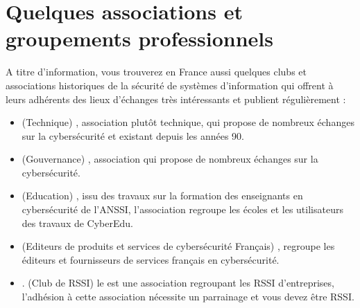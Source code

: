 \section{Quelques associations et groupements professionnels} 

A titre d'information, vous trouverez en France aussi quelques clubs et associations historiques de la sécurité de systèmes d'information qui offrent à leurs adhérents des lieux d'échanges très intéressants et publient régulièrement  :



\begin{itemize}

  \item{} (Technique)
, association plutôt technique, qui propose de nombreux échanges sur la cybersécurité et existant depuis les années 90.
  \item{} (Gouvernance)
, association qui propose de nombreux échanges sur la cybersécurité.

  \item{} (Education)
, issu des travaux sur la formation des enseignants en cybersécurité de l'ANSSI, l'association regroupe les écoles et les utilisateurs des travaux de CyberEdu.

  \item{} (Editeurs de produits et services de cybersécurité Français)
, regroupe les éditeurs et fournisseurs de services français en cybersécurité.

  \item {}. (Club de RSSI)
le  est une association regroupant les RSSI d'entreprises, l'adhésion à cette association nécessite un parrainage et vous devez être RSSI.
\end{itemize}

